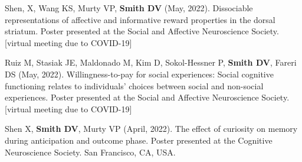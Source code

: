 \documentclass[11pt, letterpaper]{article}
\begin{document}
\begin{hangparas}{.5in}{1}
Shen, X, Wang KS, Murty VP, \textbf{Smith DV} (May, 2022). Dissociable representations of affective and informative reward properties in the dorsal striatum. Poster presented at the Social and Affective Neuroscience Society. [virtual meeting due to COVID-19]

Ruiz M, Stasiak JE, Maldonado M, Kim D, Sokol-Hessner P, \textbf{Smith DV}, Fareri DS (May, 2022). Willingness-to-pay for social experiences: Social cognitive functioning relates to individuals' choices between social and non-social experiences. Poster presented at the Social and Affective Neuroscience Society. [virtual meeting due to COVID-19]

Shen X, \textbf{Smith DV}, Murty VP (April, 2022). The effect of curiosity on memory during anticipation and outcome phase. Poster presented at the Cognitive Neuroscience Society. San Francisco, CA, USA. \\

\end{hangparas}
\end{document}
